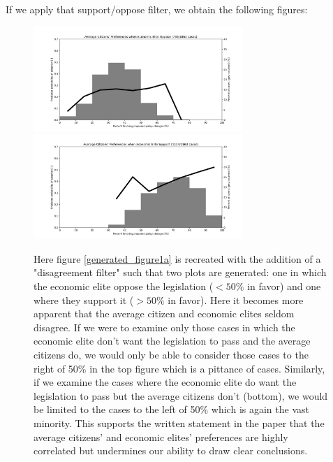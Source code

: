 \documentclass[]{article}
\begin{document}
If we apply that support/oppose filter, we obtain the following figures:
\begin{figure}[H]
	\begin{center}
		\includegraphics[width=300px]{./figures/generated/contrasting-desires/average-citizens-preferences-when-rich-no-want.png}
		\includegraphics[width=300px]{./figures/generated/contrasting-desires/average-citizens-preferences-when-rich-wants.png}
	\end{center}	
	\caption{Here figure \ref{generated_figure1a} is recreated with the addition of a "disagreement filter" such that two plots are generated: one in which the economic elite oppose the legislation ($< 50\%$ in favor) and one where they support it ($> 50\%$ in favor). Here it becomes more apparent that the average citizen and economic elites seldom disagree. If we were to examine only those cases in which the economic elite don't want the legislation to pass and the average citizens do, we would only be able to consider those cases to the right of 50\% in the top figure which is a pittance of cases. Similarly, if we examine the cases where the economic elite do want the legislation to pass but the average citizens don't (bottom), we would be limited to the cases to the left of 50\% which is again the vast minority. This supports the written statement in the paper that the average citizens' and economic elites' preferences are highly correlated but undermines our ability to draw clear conclusions.}
	\label{generated_filtered_figure1a}
\end{figure}
\end{document}
